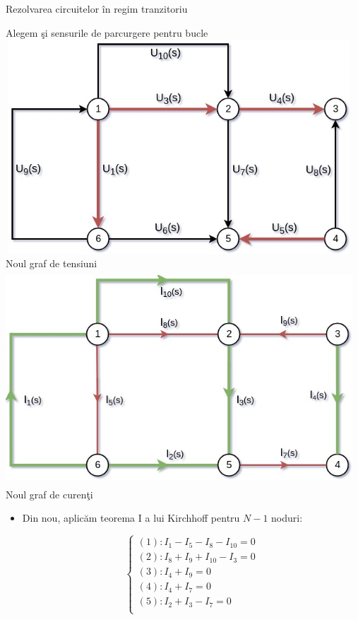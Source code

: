 \documentclass[a4paper]{article}
\begin{document}
\begin{section}{Rezolvarea circuitelor \^ in regim tranzitoriu \\[0.5cm]}
\begin{center}
	Alegem \c si sensurile de parcurgere pentru bucle \\[1.7cm]
	\includegraphics[width=13cm, height=8cm]{grafUop.jpg} \\ 
	Noul graf de tensiuni \\[2cm]
	\includegraphics[width=13cm, height=8cm]{grafIop.jpg} \\
	Noul graf de curen\c ti  \\[1cm] 
\end{center}

\begin{itemize}
	\item Din nou, aplic\u am teorema I a lui Kirchhoff pentru $ N - 1 $ noduri:
	
 	\begin{large} \[ \left\{ \begin{array}{ll}
		(1): {I}_1 -  {I}_5 - {I}_8 - {I}_{10} = 0 \\
		(2): {I}_8 + {I}_9  + {I}_{10} - {I}_3 = 0 \\
		(3): {I}_4 + {I}_9 = 0 \\
		(4): {I}_4 + {I}_7 = 0 \\
		(5): {I}_2 + {I}_3 - {I}_7 = 0 \\
	\end{array} \right. \] \end{large}


\end{itemize}
\end{section}
\end{document}
